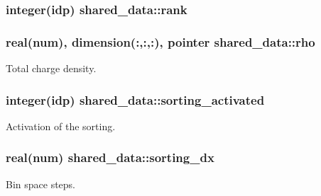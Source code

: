 \subsubsection[{\texorpdfstring{rank}{rank}}]{\setlength{\rightskip}{0pt plus 5cm}integer(idp) shared\+\_\+data\+::rank}\hypertarget{namespaceshared__data_a7e8de99f54b7f7fcc513be2975546b9e}{}\label{namespaceshared__data_a7e8de99f54b7f7fcc513be2975546b9e}
\subsubsection[{\texorpdfstring{rho}{rho}}]{\setlength{\rightskip}{0pt plus 5cm}real(num), dimension(\+:,\+:,\+:), pointer shared\+\_\+data\+::rho}\hypertarget{namespaceshared__data_a9cd7a07e41ca84210bf52e8480ac5d62}{}\label{namespaceshared__data_a9cd7a07e41ca84210bf52e8480ac5d62}


Total charge density. 

\subsubsection[{\texorpdfstring{sorting\+\_\+activated}{sorting_activated}}]{\setlength{\rightskip}{0pt plus 5cm}integer(idp) shared\+\_\+data\+::sorting\+\_\+activated}\hypertarget{namespaceshared__data_aa7be2be1e809cb95538e562e604c4f1e}{}\label{namespaceshared__data_aa7be2be1e809cb95538e562e604c4f1e}


Activation of the sorting. 

\subsubsection[{\texorpdfstring{sorting\+\_\+dx}{sorting_dx}}]{\setlength{\rightskip}{0pt plus 5cm}real(num) shared\+\_\+data\+::sorting\+\_\+dx}\hypertarget{namespaceshared__data_a3f406bc80cf450b11767a651d0ea651c}{}\label{namespaceshared__data_a3f406bc80cf450b11767a651d0ea651c}


Bin space steps. 

